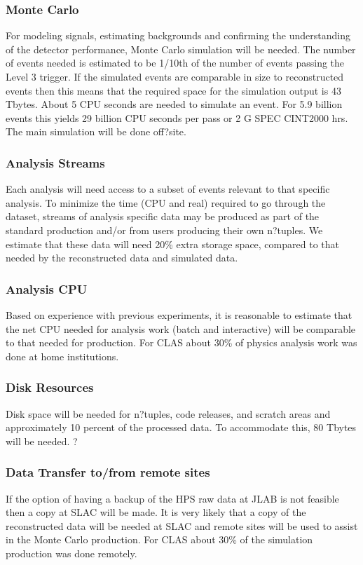 \subsubsection{Monte Carlo}
For modeling signals, estimating backgrounds and confirming the understanding of the detector performance, Monte Carlo simulation will be needed. The number of events needed is estimated to be 1/10th of the number of events passing the Level 3 trigger. If the simulated events are comparable in size to reconstructed events then this means that the required space for the simulation output is 43 Tbytes. About 5 CPU seconds are needed to simulate an event. For 5.9 billion events this yields 29 billion CPU seconds per pass or 2 G SPEC CINT2000 hrs. The main simulation will be done off?site.

\subsubsection{Analysis Streams}
Each analysis will need access to a subset of events relevant to that specific analysis. To minimize the time (CPU and real) required to go through the dataset, streams of analysis specific data may be produced as part of the standard production and/or from users producing their own n?tuples. We estimate that these data will need 20\% extra storage space, compared to that needed by the reconstructed data and simulated data.

\subsubsection{Analysis CPU}
Based on experience with previous experiments, it is reasonable to estimate that the net CPU needed for analysis work (batch and interactive) will be comparable to that needed for production. For CLAS about 30\% of physics analysis work was done at home institutions.

\subsubsection{Disk Resources}
Disk space will be needed for n?tuples, code releases, and scratch areas and approximately 10 percent of the processed data. To accommodate this, 80 Tbytes will be needed.
?
\subsubsection{Data Transfer to/from remote sites}

If the option of having a backup of the HPS raw data at JLAB is not feasible then a copy at SLAC will be made. It is very likely that a copy of the reconstructed data will be needed at SLAC and remote sites will be used to assist in the Monte Carlo production. For CLAS about 30\% of the simulation production was done remotely.

